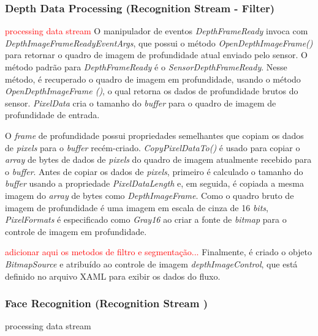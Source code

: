 \subsubsection{Depth Data Processing (Recognition Stream - Filter)}\label{sec:depthDataProcessing}
\textcolor{red}{processing data stream}
O manipulador de eventos \textit{DepthFrameReady} invoca com \textit{DepthImageFrameReadyEventArgs}, que possui o método \textit{OpenDepthImageFrame()} para retornar o quadro de imagem de profundidade atual enviado pelo sensor. O  método padrão para \textit{DepthFrameReady} é o \textit{SensorDepthFrameReady}. Nesse método, é recuperado o quadro de imagem em profundidade, usando o método \textit{OpenDepthImageFrame ()}, o qual retorna os dados de profundidade brutos do sensor. \textit{PixelData} cria o tamanho do \textit{buffer} para o quadro de imagem de profundidade de entrada.

O \textit{frame} de profundidade possui propriedades semelhantes que copiam os dados de \textit{pixels} para o \textit{buffer} recém-criado. \textit{CopyPixelDataTo()} é usado para copiar o \textit{array} de bytes de dados de \textit{pixels} do quadro de imagem atualmente recebido para o \textit{buffer}. Antes de copiar os dados de \textit{pixels}, primeiro é calculado o tamanho do \textit{buffer} usando a propriedade \textit{PixelDataLength} e, em seguida, é copiada a mesma imagem do \textit{array} de bytes como \textit{DepthImageFrame}. Como o quadro bruto de imagem de profundidade é uma imagem em escala de cinza de 16 \textit{bits}, \textit{PixelFormats} é especificado  como \textit{Gray16} ao criar a fonte de \textit{bitmap} para o controle de imagem em profundidade.

\textcolor{red}{adicionar aqui os metodos de filtro e segmentação...}
Finalmente, é criado o objeto \textit{BitmapSource} e atribuído ao controle de imagem \textit{depthImageControl}, que está definido no arquivo XAML para exibir os dados do fluxo.




\subsubsection{Face Recognition (Recognition Stream )}\label{sec:depthDataRecognition}
processing data stream